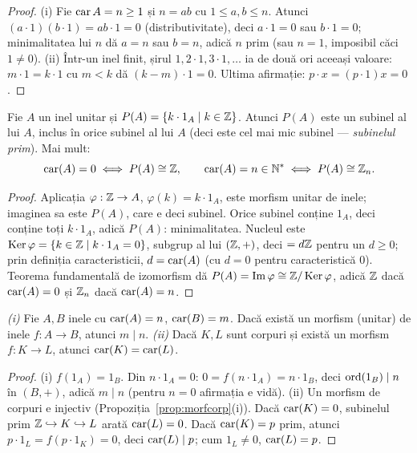 \begin{proof}
(i) Fie $\operatorname{car} A=n\ge1$ și $n=ab$ cu $1\le a,b\le n$. Atunci $(a\cdot1)(b\cdot1)=ab\cdot1=0$ (distributivitate), deci $a\cdot1=0$ sau $b\cdot1=0$; minimalitatea lui $n$ dă $a=n$ sau $b=n$, adică $n$ prim (sau $n=1$, imposibil căci $1\neq0$). (ii) Într-un inel finit, șirul $1,2\cdot1,3\cdot1,\dots$ ia de două ori aceeași valoare: $m\cdot1=k\cdot1$ cu $m<k$ dă $(k-m)\cdot1=0$. Ultima afirmație: $p\cdot x=(p\cdot1)x=0$.
\end{proof}

\begin{propozitie}\label{prop:subinelprim}
Fie $A$ un inel unitar și $P(A)=\{k\cdot 1_A\mid k\in\mathbb{Z}\}$. Atunci $P(A)$ este un subinel al lui $A$, inclus în orice subinel al lui $A$ (deci este cel mai mic subinel --- \emph{subinelul prim}). Mai mult:
\[
\operatorname{car}(A)=0\iff P(A)\cong\mathbb{Z},\qquad \operatorname{car}(A)=n\in\mathbb{N}^*\iff P(A)\cong\mathbb{Z}_n.
\]
\end{propozitie}
\begin{proof}
Aplicația $\varphi:\mathbb{Z}\to A$, $\varphi(k)=k\cdot 1_A$, este morfism unitar de inele; imaginea sa este $P(A)$, care e deci subinel. Orice subinel conține $1_A$, deci conține toți $k\cdot 1_A$, adică $P(A)$: minimalitatea. Nucleul este $\operatorname{Ker}\varphi=\{k\in\mathbb{Z}\mid k\cdot 1_A=0\}$, subgrup al lui $(\mathbb{Z},+)$, deci $=d\mathbb{Z}$ pentru un $d\ge0$; prin definiția caracteristicii, $d=\operatorname{car}(A)$ (cu $d=0$ pentru caracteristică $0$). Teorema fundamentală de izomorfism dă $P(A)=\operatorname{Im}\varphi\cong\mathbb{Z}/\operatorname{Ker}\varphi$, adică $\mathbb{Z}$ dacă $\operatorname{car}(A)=0$ și $\mathbb{Z}_n$ dacă $\operatorname{car}(A)=n$.
\end{proof}

\begin{propozitie}\label{prop:carmorf}
\emph{(i)} Fie $A,B$ inele cu $\operatorname{car}(A)=n$, $\operatorname{car}(B)=m$. Dacă există un morfism (unitar) de inele $f:A\to B$, atunci $m\mid n$.
\emph{(ii)} Dacă $K,L$ sunt corpuri și există un morfism $f:K\to L$, atunci $\operatorname{car}(K)=\operatorname{car}(L)$.
\end{propozitie}
\begin{proof}
(i) $f(1_A)=1_B$. Din $n\cdot 1_A=0$: $0=f(n\cdot 1_A)=n\cdot 1_B$, deci $\operatorname{ord}(1_B)\mid n$ în $(B,+)$, adică $m\mid n$ (pentru $n=0$ afirmația e vidă). (ii) Un morfism de corpuri e injectiv (Propoziția~\ref{prop:morfcorp}(i)). Dacă $\operatorname{car}(K)=0$, subinelul prim $\mathbb{Z}\hookrightarrow K\hookrightarrow L$ arată $\operatorname{car}(L)=0$. Dacă $\operatorname{car}(K)=p$ prim, atunci $p\cdot 1_L=f(p\cdot 1_K)=0$, deci $\operatorname{car}(L)\mid p$; cum $1_L\neq0$, $\operatorname{car}(L)=p$.
\end{proof}

